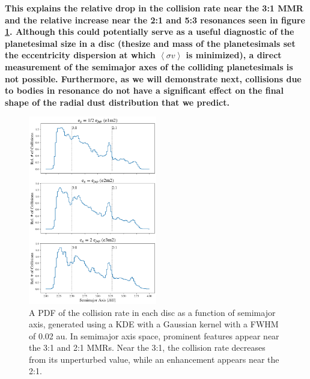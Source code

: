 \documentclass[fleqn,usenatbib]{mnras}
\begin{document}
\textbf{ This explains the relative drop in the collision rate
near the 3:1 MMR and the relative increase near the 2:1 and 5:3
resonances \textbf{seen in figure \ref{fig:coll_hist_a}}. Although this could potentially serve as a useful
diagnostic of the planetesimal size in a disc (the\textbf{size and mass of the planetesimals set the eccentricity dispersion at which $\left< \sigma v \right>$ is minimized}), a direct measurement of the
semimajor axes of the colliding planetesimals is not
possible. Furthermore, as we will demonstrate next, collisions due to bodies in resonance do not have a significant effect on the final shape of the radial dust distribution that we predict.}

\begin{figure}
\begin{center}
    \includegraphics[width=0.5\textwidth]{figures/coll_hist_a.png}
    \caption{A PDF of the collision rate in each disc as a function of semimajor axis, generated using a KDE with a Gaussian kernel with a FWHM of 0.02 au. In semimajor axis space, prominent features appear near the 3:1 and 2:1 MMRs. Near the 3:1, the collision rate decreases from its unperturbed value, while an enhancement appears near the 2:1.\label{fig:coll_hist_a}}
\end{center}
\end{figure}
\end{document}
